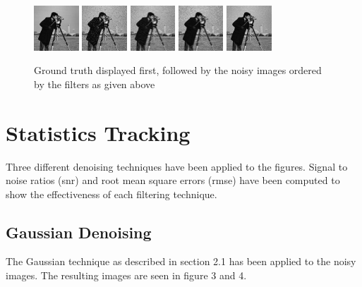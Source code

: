 \documentclass{article}
\begin{document}
\begin{figure}[H]
  \centering
  \includegraphics[width =0.15\textwidth]{../images/camera_truth}
  \includegraphics[width =0.15\textwidth]{../images/camera_noisy1}
  \includegraphics[width =0.15\textwidth]{../images/camera_noisy2}
  \includegraphics[width =0.15\textwidth]{../images/camera_noisy3}
  \includegraphics[width =0.15\textwidth]{../images/camera_noisy4}
  \caption{Ground truth displayed first, followed by the noisy
    images ordered by the filters as given above}
\end{figure}   
% 
\section{Statistics Tracking}
% 
Three different denoising techniques have been applied to the
figures. Signal to noise ratios (snr) and root mean
square errors (rmse) have been computed to show the effectiveness of each
filtering technique.
% 
\subsection{Gaussian Denoising}
The Gaussian technique as described in section 2.1 has been applied
to the noisy images. The resulting images are seen in figure 3 and 4.
\end{document}
